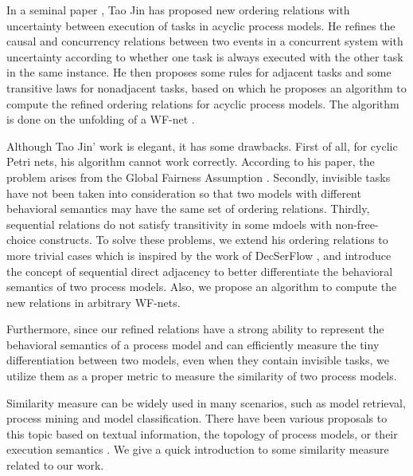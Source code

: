 \documentclass{llncs}
\begin{document}
In a seminal paper \cite{jin2014computing}, Tao Jin has proposed new ordering relations with uncertainty between execution of tasks in acyclic process models. He refines the causal and concurrency relations between two events in a concurrent system with uncertainty according to whether one task is always executed with the other task in the same instance. He then proposes some rules for adjacent tasks and some transitive laws for nonadjacent tasks, based on which he proposes an algorithm to compute the refined ordering relations for acyclic process models. The algorithm is done on the unfolding of a WF-net \cite{mcmillan1995technique,esparza1996improvement}.

Although Tao Jin' work is elegant, it has some drawbacks. First of all, for cyclic Petri nets, his algorithm cannot work correctly. According to his paper, the problem arises from the Global Fairness Assumption \cite{kindler1999liveness}. Secondly, invisible tasks have not been taken into consideration so that two models with different behavioral semantics may have the same set of ordering relations. Thirdly, sequential relations do not satisfy transitivity in some mdoels with non-free-choice constructs. To solve these problems, we extend his ordering relations to more trivial cases which is inspired by the work of DecSerFlow \cite{van2006decserflow}, and introduce the concept of sequential direct adjacency to better differentiate the behavioral semantics of two process models. Also, we propose an algorithm to compute the new relations in arbitrary WF-nets.

Furthermore, since our refined relations have a strong ability to represent the behavioral semantics of a process model and can efficiently measure the tiny differentiation between two models, even when they contain invisible tasks, we utilize them as a proper metric to measure the similarity of two process models.

Similarity measure can be widely used in many scenarios, such as model retrieval, process mining and model classification. There have been various proposals to this topic based on textual information, the topology of process models, or their execution semantics \cite{weidlich2011efficient}. We give a quick introduction to some similarity measure related to our work.
\end{document}
